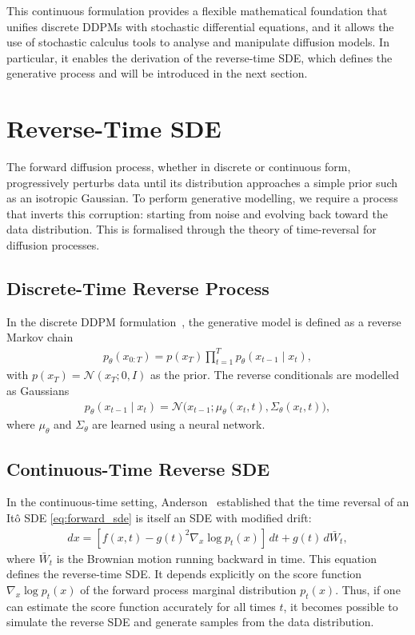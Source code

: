 \documentclass[12pt]{report}
\begin{document}
This continuous formulation provides a flexible mathematical foundation that unifies discrete DDPMs with stochastic differential equations, and it allows the use of stochastic calculus tools to analyse and manipulate diffusion models. 
In particular, it enables the derivation of the reverse-time SDE, which defines the generative process and will be introduced in the next section.

\section{Reverse-Time SDE}
The forward diffusion process, whether in discrete or continuous form, progressively perturbs data until its distribution approaches a simple prior such as an isotropic Gaussian. 
To perform generative modelling, we require a process that inverts this corruption: starting from noise and evolving back toward the data distribution. 
This is formalised through the theory of time-reversal for diffusion processes.
\subsection{Discrete-Time Reverse Process}
In the discrete DDPM formulation~\cite{hoDenoisingDiffusionProbabilistic2020}, the generative model is defined as a reverse Markov chain
\begin{align*}
    p_\theta\left(x_{0:T}\right) = p(x_T) \prod_{t=1}^{T} p_\theta(x_{t-1} \mid x_t),
\end{align*}
with $p(x_T) = \mathcal{N}(x_T;0,I)$ as the prior. 
The reverse conditionals are modelled as Gaussians
\begin{align*}
    p_\theta\left(x_{t-1} \mid x_t\right) = \mathcal{N}\!\big(x_{t-1}; \mu_\theta(x_t,t), \Sigma_\theta(x_t,t)\big),
\end{align*}
where $\mu_\theta$ and $\Sigma_\theta$ are learned using a neural network. 

\subsection{Continuous-Time Reverse SDE}
In the continuous-time setting, Anderson~\cite{andersonReversetimeDiffusionEquation1982} established that the time reversal of an It\^{o} SDE \eqref{eq:forward_sde}
is itself an SDE with modified drift:
\begin{align}\label{eq:reverse_sde}
    dx = \left[f(x,t) - g(t)^2 \nabla_x \log p_t(x)\right]\,dt + g(t)\,d\bar W_t,
\end{align}
where \(\bar W_t\) is the Brownian motion running backward in time. This equation defines the reverse-time SDE. It depends explicitly on the score function \(\nabla_x \log p_t(x)\) of the forward process marginal distribution \(p_t(x)\). Thus, if one can estimate the score function accurately for all times \(t\), it becomes possible to simulate the reverse SDE and generate samples from the data distribution.
\end{document}
